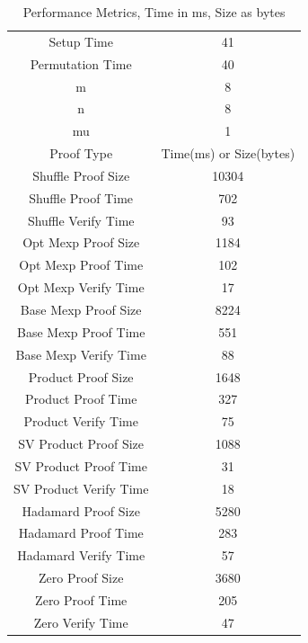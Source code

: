 \documentclass[12pt,a4paper]{report}
\begin{document}
\begin{table}
	\begin{center}
	\begin{tabular}{||c|c||}
		\hline
		Setup Time&41\\
		Permutation Time&40\\
		\hline
		m&8\\
		n&8\\
		mu&1\\
		\hline \hline
		Proof Type&Time(ms) or Size(bytes)\\
		\hline
		Shuffle Proof Size&10304\\
		Shuffle Proof Time&702\\
		Shuffle Verify Time&93\\
		\hline
		Opt Mexp Proof Size&1184\\
		Opt Mexp Proof Time&102\\
		Opt Mexp Verify Time&17\\

		Base Mexp Proof Size&8224\\
		Base Mexp Proof Time&551\\
		Base Mexp Verify Time&88\\
		\hline
		Product Proof Size&1648\\
		Product Proof Time&327\\
		Product Verify Time&75\\
		\hline
		SV Product Proof Size&1088\\
		SV Product Proof Time&31\\
		SV Product Verify Time&18\\
		\hline
		Hadamard Proof Size&5280\\
		Hadamard Proof Time&283\\
		Hadamard Verify Time&57\\
		\hline
		Zero Proof Size&3680\\
		Zero Proof Time&205\\
		Zero Verify Time&47\\
		\hline 
	\end{tabular}
	\end{center}
	\caption{Performance Metrics, Time in ms, Size as bytes}
	\label{table:allresults}
\end{table}
\end{document}
